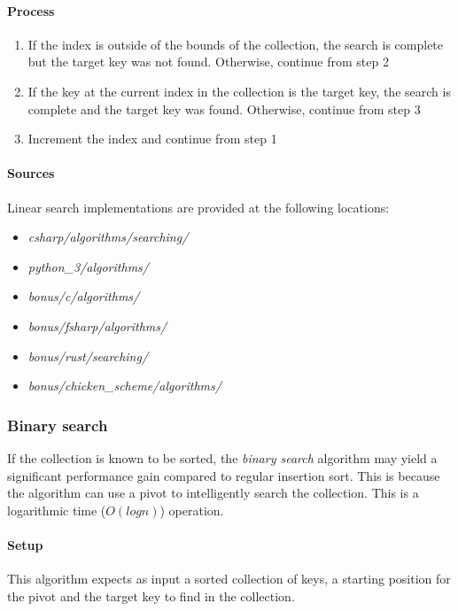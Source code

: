 \documentclass{article}
\begin{document}
\paragraph{Process}
\begin{enumerate}
\item{If the index is outside of the bounds of the collection, the search is complete but the target key was not found.
  Otherwise, continue from step 2}
\item{If the key at the current index in the collection is the target key, the search is complete and the target key was found.
  Otherwise, continue from step 3}
\item{Increment the index and continue from step 1}
\end{enumerate}

\begin{samepage}
  \paragraph{Sources}
  Linear search implementations are provided at the following locations:
  \begin{itemize}
  \item{{\em csharp/algorithms/searching/}}
  \item{{\em python\_3/algorithms/}}
  \item{{\em bonus/c/algorithms/}}
  \item{{\em bonus/fsharp/algorithms/}}
  \item{{\em bonus/rust/searching/}}
  \item{{\em bonus/chicken\_scheme/algorithms/}}
  \end{itemize}
\end{samepage}

\subsubsection{Binary search}
If the collection is known to be sorted, the {\em binary search} algorithm may yield a significant performance
gain compared to regular insertion sort. This is because the algorithm can use a pivot to intelligently search
the collection. This is a logarithmic time (\(O(log n)\)) operation.

\paragraph{Setup}
This algorithm expects as input a sorted collection of keys, a starting position for the pivot and the target key to find in
the collection.
\end{document}
